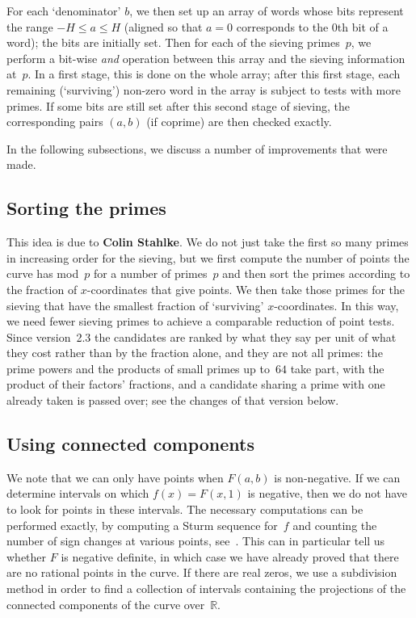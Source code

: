 \documentclass[12pt,a4paper,oneside]{amsart}
\newcommand{\R}{{\mathbb R}}
\begin{document}
For each `denominator' $b$, we then set up an array of words whose bits
represent the range $-H \le a \le H$ (aligned so that $a = 0$ corresponds
to the $0$th bit of a word); the bits are initially set. Then for each
of the sieving primes~$p$, we perform a bit-wise {\em and} operation
between this array and the sieving information at~$p$. In a first stage,
this is done on the whole array; after this first stage, each remaining
(`surviving') non-zero word in the array is subject to tests with more
primes. If some bits are still set after this second stage of sieving,
the corresponding pairs $(a, b)$ (if coprime) are then checked exactly.

In the following subsections, we discuss a number of improvements that
were made.

\subsection{Sorting the primes}

This idea is due to \textbf{Colin Stahlke}. We do not just take the first so many
primes in increasing order for the sieving, but we first compute the
number of points the curve has mod~$p$ for a number of primes~$p$ and then
sort the primes according to the fraction of $x$-coordinates that give points.
We then take those primes for the sieving that have the smallest fraction
of `surviving' $x$-coordinates. In this way, we need fewer sieving primes
to achieve a comparable reduction of point tests. Since version~2.3 the
candidates are ranked by what they say per unit of what they cost rather
than by the fraction alone, and they are not all primes: the prime powers
and the products of small primes up to~$64$ take part, with the product of
their factors' fractions, and a candidate sharing a prime with one already
taken is passed over; see the changes of that version below.

\subsection{Using connected components}

We note that we can only have points when $F(a, b)$ is non-negative.
If we can determine intervals on which $f(x) = F(x, 1)$ is negative, then
we do not have to look for points in these intervals. The necessary
computations can be performed exactly, by computing a Sturm sequence
for~$f$ and counting the number of sign changes at various points,
see~\cite[Thm.~4.1.10]{Cohen}. This can in particular tell us whether
$F$ is negative definite, in which case we have already proved that there
are no rational points in the curve. If there are real zeros, we use
a subdivision method in order to find a collection of intervals containing
the projections of the connected components of the curve over~$\R$.
\end{document}
